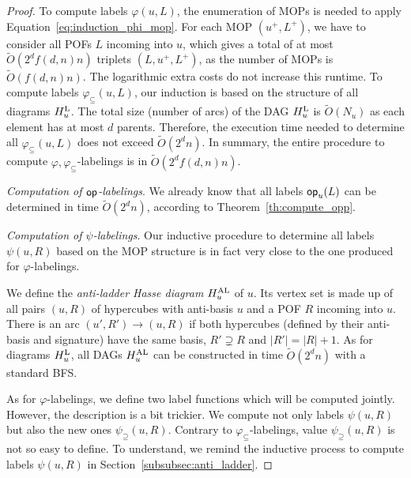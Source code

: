 \documentclass{article}
\newcommand{\card}[1]{\left| #1 \right|}
\newcommand{\opp}{\mbox{\textsf{op}}}
\newcommand{\hul}{H_u^{\mbox{\scriptsize{L}}}}
\newcommand{\hual}{H_u^{\mbox{\scriptsize{AL}}}}
\newcommand{\varphis}{\varphi_{\subseteq}}
\newcommand{\psis}{\psi_{\supseteq}}
\begin{document}
\begin{proof}
To compute labels $\varphi(u,L)$, the enumeration of MOPs is needed to apply Equation~\eqref{eq:induction_phi_mop}. For each MOP $(u^+,L^+)$, we have to consider all POFs $L$ incoming into $u$, which gives a total of at most $\tilde{O}(2^df(d,n)n)$ triplets $(L,u^+,L^+)$, as the number of MOPs is $\tilde{O}(f(d,n)n)$. The logarithmic extra costs do not increase this runtime. To compute labels $\varphis(u,L)$, our induction is based on the structure of all diagrams $\hul$. The total size (number of arcs) of the DAG $\hul$ is $\tilde{O}(N_u)$ as each element has at most $d$ parents. Therefore, the execution time needed to determine all $\varphis(u,L)$ does not exceed $\tilde{O}(2^dn)$. In summary, the entire procedure to compute $\varphi,\varphis$-labelings is in $\tilde{O}(2^df(d,n)n)$.

\textit{Computation of $\opp$-labelings}. We already know that all labels $\opp_u(L)$ can be determined in time $\tilde{O}(2^dn)$, according to Theorem~\ref{th:compute_opp}.

\textit{Computation of $\psi$-labelings}. Our inductive procedure to determine all labels $\psi(u,R)$ based on the MOP structure is in fact very close to the one produced for $\varphi$-labelings.

We define the \textit{anti-ladder Hasse diagram} $\hual$ of $u$. Its vertex set is made up of all pairs $(u,R)$ of hypercubes with anti-basis $u$ and a POF $R$ incoming into $u$. There is an arc $(u',R')\rightarrow (u,R)$ if both hypercubes (defined by their anti-basis and signature) have the same basis, $R' \supsetneq R$ and $\card{R'} = \card{R} + 1$. As for diagrams $\hul$, all DAGs $\hual$ can be constructed in time $\tilde{O}(2^dn)$ with a standard BFS.

As for $\varphi$-labelings, we define two label functions which will be computed jointly. However, the description is a bit trickier. We compute not only labels $\psi(u,R)$ but also the new ones $\psis(u,R)$. Contrary to $\varphis$-labelings, value $\psis(u,R)$ is not so easy to define. To understand, we remind the inductive process to compute labels $\psi(u,R)$ in Section~\ref{subsubsec:anti_ladder}.


\end{proof}
\end{document}
